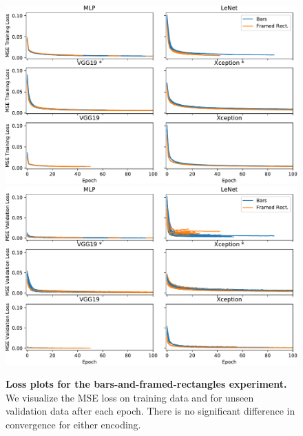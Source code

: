 \documentclass[journal]{vgtc}        %
\begin{document}
\begin{figure}[tbhp]
	\centering
	  \includegraphics[width=\linewidth]{../gfx/figure12_training_loss.pdf}
	  \includegraphics[width=\linewidth]{../gfx/figure12_val_loss.pdf}
  \caption{\textbf{Loss plots for the bars-and-framed-rectangles experiment.} We visualize the MSE loss on training data and for unseen validation data after each epoch. There is no significant difference in convergence for either encoding.}
	\label{fig:fig12_loss}
\end{figure}
\end{document}
